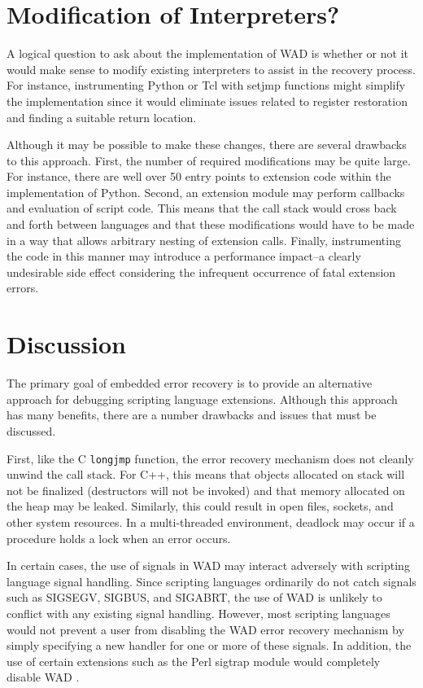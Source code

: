 \section{Modification of Interpreters?}

A logical question to ask about the implementation of WAD is whether
or not it would make sense to modify existing interpreters to assist
in the recovery process. For instance, instrumenting Python or Tcl with setjmp
functions might simplify the implementation since it would eliminate
issues related to register restoration and finding a suitable return
location.

Although it may be possible to make these changes, there are 
several drawbacks to this approach.  First, the number of required modifications may be
quite large.  For instance, there are well over 50 entry points to
extension code within the implementation of Python.  Second, an
extension module may perform callbacks and evaluation of script code.
This means that the call stack would cross back and forth
between languages and that these modifications would have to be made
in a way that allows arbitrary nesting of extension calls.  Finally,
instrumenting the code in this manner may introduce a performance
impact--a clearly undesirable side effect considering the infrequent
occurrence of fatal extension errors.

\section{Discussion}

The primary goal of embedded error recovery is to provide an
alternative approach for debugging scripting language extensions.
Although this approach has many benefits, there are a number
drawbacks and issues that must be discussed.

First, like the C {\tt longjmp} function, the error recovery mechanism
does not cleanly unwind the call stack.  For C++, this means that
objects allocated on stack will not be finalized (destructors will not
be invoked) and that memory allocated on the heap may be
leaked. Similarly, this could result in open files, sockets, and other
system resources. In a multi-threaded environment,
deadlock may occur if a procedure holds a lock when an error occurs.

In certain cases, the use of signals in WAD may interact adversely with scripting
language signal handling. Since scripting languages ordinarily do not catch signals such as
SIGSEGV, SIGBUS, and SIGABRT, the use of WAD is unlikely to conflict
with any existing signal handling. However, most scripting languages would not 
prevent a user from disabling the WAD error recovery mechanism by 
simply specifying a new handler for one or more of these signals.  In addition, the use of 
certain extensions such as the Perl sigtrap module would completely 
disable WAD \cite{perl}.

